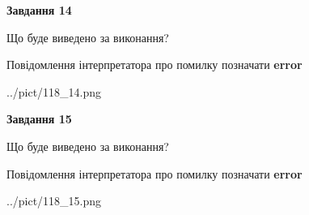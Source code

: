 \documentclass[11pt, ukrainian]{article}
\begin{document}
{\begin {large}
{\begin {center}\textbf{Завдання 14}\end {center}}\par
Що буде виведено за виконання? \par
Повідомлення інтерпретатора про помилку позначати \textbf{error}

\begin{center}
	{../pict/118_14.png}
\end{center}
\newpage

{\begin {center}\textbf{Завдання 15}\end {center}}\par
Що буде виведено за виконання? \par
Повідомлення інтерпретатора про помилку позначати \textbf{error}

\begin{center}
	{../pict/118_15.png}
\end{center}
\newpage

\end {large}}
\end{document}
